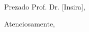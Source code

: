 \documentclass[11pt]{letter}
\date{}
\begin{document}
\begin{letter}{}

  \opening{Prezado Prof. Dr. [Insira],}

    \closing{Atenciosamente,}

\end{letter}
\end{document}
